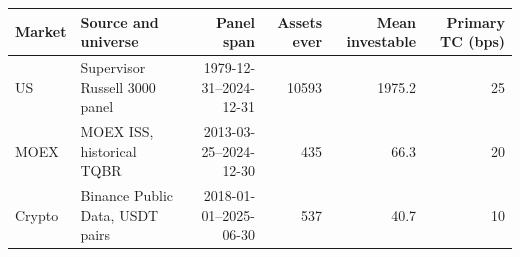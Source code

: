 \footnotesize
\setlength{\tabcolsep}{5pt}
\begin{tabular}{llrrrr}
\toprule
Market & Source and universe & Panel span & Assets ever & Mean investable & Primary TC (bps) \\
\midrule
US & Supervisor Russell 3000 panel & 1979-12-31--2024-12-31 & 10593 & 1975.2 & 25 \\
MOEX & MOEX ISS, historical TQBR & 2013-03-25--2024-12-30 & 435 & 66.3 & 20 \\
Crypto & Binance Public Data, USDT pairs & 2018-01-01--2025-06-30 & 537 & 40.7 & 10 \\
\bottomrule
\end{tabular}
